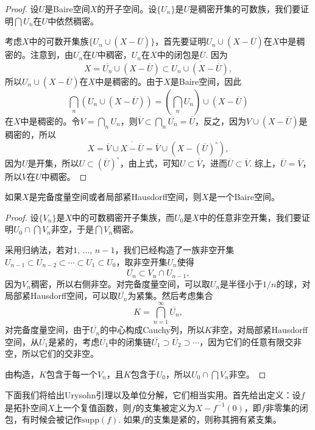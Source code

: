 \begin{proof}
	设$U$是Baire空间$X$的开子空间。设$\{U_n\}$是$U$是稠密开集的可数族，我们要证明$\bigcap U_n$在$U$中依然稠密。

	考虑$X$中的可数开集族$\{U_n\cup (X-\overline{U})\}$，首先要证明$U_n\cup (X-\overline{U})$在$X$中是稠密的。注意到，由$U_n$在$U$中稠密，$U_n$在$X$中的闭包是$\overline{U}$. 因为
	\[
	X=\overline{U_n}\cup (X-\overline{U})\subset \overline{U_n\cup (X-\overline{U})},
	\]
	所以$U_n\cup (X-\overline{U})$在$X$中是稠密的。由于$X$是Baire空间，因此
	\[
	\bigcap_n\left(U_n\cup (X-\overline{U})\right)=\left(\bigcap_n U_n\right)\cup (X-\overline{U}) 
	\]
	在$X$中是稠密的。令$V=\bigcap_n U_n$，则$\overline{V}\subset \bigcap_n \overline{U_n}=\overline{U}$，反之，因为$V\cup (X-\overline{U})$是稠密的，所以
	\[
		X=\overline{V}\cup \overline{X-\overline{U}}=\overline{V}\cup \left(X-(\overline{U})^\circ\right),
	\]
	因为$U$是开集，所以$U\subset (\overline{U})^\circ$，由上式，可知$U\subset \overline{V}$，进而$\overline{U}\subset \overline{V}$. 综上，$\overline{U}=\overline{V}$，所以$V$在$U$中稠密。
\end{proof}

\begin{thm}[Baire纲定理]
	如果$X$是完备度量空间或者局部紧Hausdorff空间，则$X$是一个Baire空间。
\end{thm}

\begin{proof}
	设$\{V_n\}$是$X$中的可数稠密开子集族，而$U_0$是$X$中的任意非空开集，我们要证明$U_0\cap \bigcap V_n$非空，于是$\bigcap V_n$稠密。

	采用归纳法，若对$1$, $\dots$, $n-1$，我们已经构造了一族非空开集$U_{n-1}\subset U_{n-2}\subset \cdots \subset U_1\subset U_0$，取非空开集$U_n$使得
	\[
	\overline {U_n}\subset V_n\cap U_{n-1},
	\]
	因为$V_n$稠密，所以右侧非空。对完备度量空间，可以取$U_n$是半径小于$1/n$的球，对局部紧Hausdorff空间，可以取$\overline {U_n}$为紧集。然后考虑集合
	\[
	K=\bigcap_{n=1}^\infty \overline {U_n},
	\]
	对完备度量空间，由于$\overline {U_n}$的中心构成Cauchy列，所以$K$非空，对局部紧Hausdorff空间，从$\overline {U_1}$是紧的，考虑$\overline {U_1}$中的闭集链$\overline {U_1}\supset \overline {U_2}\supset \cdots$，因为它们的任意有限交非空，所以它们的交非空。

	由构造，$K$包含于每一个$V_n$，且$K$包含于$U_0$，所以$U_0\cap \bigcap V_n$非空。
\end{proof}

下面我们将给出Urysohn引理以及单位分解，它们相当实用。首先给出定义：设$f$是拓扑空间$X$上一个复值函数，则$f$的支集被定义为$\overline{X-f^{-1}(0)}$，即$f$非零集的闭包，有时候会被记作$\mathrm{supp}(f)$. 如果$f$的支集是紧的，则称其拥有紧支集。

